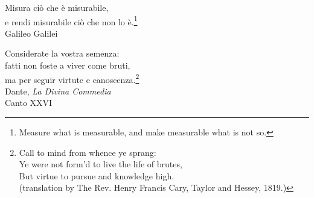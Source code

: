 \thispagestyle{empty}
\begin{flushright}

\vspace*{25mm}
Misura ciò che \`e misurabile,\\
e rendi misurabile ci\`o che non lo \`e.\footnote{Measure what is measurable, and make measurable what is not so.}\\
\vspace{4mm}
Galileo Galilei\\

\vspace{10mm}

Considerate la vostra semenza:\\
fatti non foste a viver come bruti,\\
ma per seguir virtute e canoscenza.\footnote{Call to mind from whence ye sprang:\\
Ye were not form'd to live the life of brutes,\\
But virtue to pursue and knowledge high.\\ (translation by The Rev. Henry Francis Cary, Taylor and Hessey, 1819.)}\\

\vspace{4mm}
Dante, \textit{La Divina Commedia}\\
Canto XXVI



\end{flushright}
